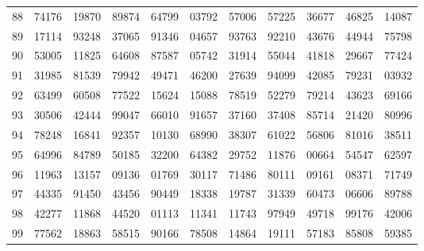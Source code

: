 \begin{table}
\begin{otherlanguage}{english}
\begin{tabular}{|C|CCCCCCCCCC|}
88&74176&19870&89874&64799&03792&57006&57225&36677&46825&14087\\
89&17114&93248&37065&91346&04657&93763&92210&43676&44944&75798\\[1ex]
90&53005&11825&64608&87587&05742&31914&55044&41818&29667&77424\\
91&31985&81539&79942&49471&46200&27639&94099&42085&79231&03932\\
92&63499&60508&77522&15624&15088&78519&52279&79214&43623&69166\\
93&30506&42444&99047&66010&91657&37160&37408&85714&21420&80996\\
94&78248&16841&92357&10130&68990&38307&61022&56806&81016&38511\\[1ex]
95&64996&84789&50185&32200&64382&29752&11876&00664&54547&62597\\
96&11963&13157&09136&01769&30117&71486&80111&09161&08371&71749\\
97&44335&91450&43456&90449&18338&19787&31339&60473&06606&89788\\
98&42277&11868&44520&01113&11341&11743&97949&49718&99176&42006\\
99&77562&18863&58515&90166&78508&14864&19111&57183&85808&59385\\
\hline
\end{tabular}
\end{otherlanguage}
\end{table}
